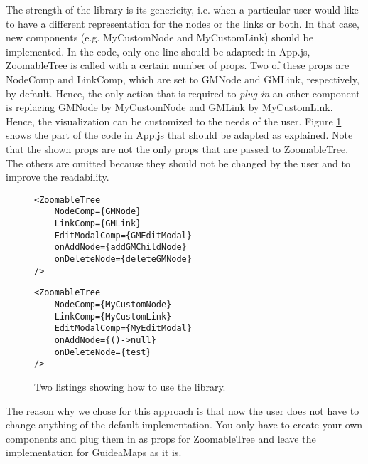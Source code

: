 The strength of the library is its genericity, i.e. when a particular user would like to have a different representation for the nodes or the links or both. In that case, new components (e.g. MyCustomNode and MyCustomLink) should be implemented. In the code, only one line should be adapted: in App.js, ZoomableTree is called with a certain number of props. Two of these props are NodeComp and LinkComp, which are set to GMNode and GMLink, respectively, by default. Hence, the only action that is required to \textit{plug in} an other component is replacing GMNode by MyCustomNode and GMLink by MyCustomLink. Hence, the visualization can be customized to the needs of the user. Figure \ref{fig:examplecode-library} shows the part of the code in App.js that should be adapted as explained. Note that the shown props are not the only props that are passed to ZoomableTree. The others are omitted because they should not be changed by the user and to improve the readability.

\begin{figure}[H]
	\begin{minipage}{0.5\textwidth}
 		 \centering
		 \begin{verbatim}
<ZoomableTree
    NodeComp={GMNode}
    LinkComp={GMLink}
    EditModalComp={GMEditModal}
    onAddNode={addGMChildNode}
    onDeleteNode={deleteGMNode}
/>
		\end{verbatim}
		\label{lst:default-components}
	\end{minipage}
 	\begin{minipage}{0.5\textwidth}
  		\centering
  		\begin{verbatim}
<ZoomableTree
    NodeComp={MyCustomNode}
    LinkComp={MyCustomLink}
    EditModalComp={MyEditModal}
    onAddNode={()->null}
    onDeleteNode={test}
/>
		\end{verbatim}
		\label{lst:custom-components}
 	\end{minipage}
	\caption{Two listings showing how to use the library.}
	\label{fig:examplecode-library}
\end{figure}

The reason why we chose for this approach is that now the user does not have to change anything of the default implementation. You only have to create your own components and plug them in as props for ZoomableTree and leave the implementation for GuideaMaps as it is.\\

